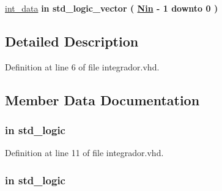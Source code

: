 \begin{DoxyCompactItemize}
\item 
\hyperlink{classintegrador_aec192442094491f2207942b96b64835c}{int\+\_\+data}  {\bfseries {\bfseries \textcolor{keywordflow}{in}\textcolor{vhdlchar}{ }}} {\bfseries \textcolor{comment}{std\+\_\+logic\+\_\+vector}\textcolor{vhdlchar}{ }\textcolor{vhdlchar}{(}\textcolor{vhdlchar}{ }\textcolor{vhdlchar}{ }\textcolor{vhdlchar}{ }\textcolor{vhdlchar}{ }{\bfseries \hyperlink{classintegrador_a2629ecb3bb37e8104b2866b0fd0c8574}{Nin}} \textcolor{vhdlchar}{-\/}\textcolor{vhdlchar}{ } \textcolor{vhdldigit}{1} \textcolor{vhdlchar}{ }\textcolor{keywordflow}{downto}\textcolor{vhdlchar}{ }\textcolor{vhdlchar}{ } \textcolor{vhdldigit}{0} \textcolor{vhdlchar}{ }\textcolor{vhdlchar}{)}\textcolor{vhdlchar}{ }} 
\end{DoxyCompactItemize}


\subsection{Detailed Description}


Definition at line 6 of file integrador.\+vhd.



\subsection{Member Data Documentation}
\hypertarget{classintegrador_a4a4609c199d30b3adebbeb3a01276ec5}{}
\subsubsection[{clk}]{ {\bfseries \textcolor{keywordflow}{in}\textcolor{vhdlchar}{ }} {\bfseries \textcolor{comment}{std\+\_\+logic}\textcolor{vhdlchar}{ }} \hspace{0.3cm}{\ttfamily [Port]}}\label{classintegrador_a4a4609c199d30b3adebbeb3a01276ec5}


Definition at line 11 of file integrador.\+vhd.

\hypertarget{classintegrador_adcf9c6f5161d039addbda5819bee64a3}{}
\subsubsection[{en}]{ {\bfseries \textcolor{keywordflow}{in}\textcolor{vhdlchar}{ }} {\bfseries \textcolor{comment}{std\+\_\+logic}\textcolor{vhdlchar}{ }} \hspace{0.3cm}{\ttfamily [Port]}}\label{classintegrador_adcf9c6f5161d039addbda5819bee64a3}


